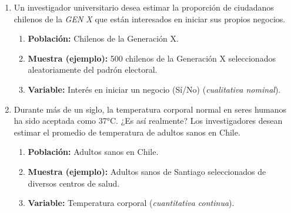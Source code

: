 \documentclass[12pt, letterpaper]{article}
\begin{document}
\begin{enumerate}
    \item Un investigador universitario desea estimar la proporción de ciudadanos chilenos de la \textit{GEN X} que están interesados en iniciar sus propios negocios.
        \begin{enumerate}
            \item \textbf{Población:} Chilenos de la Generación X.
            \item \textbf{Muestra (ejemplo):} 500 chilenos de la Generación X seleccionados aleatoriamente del padrón electoral.
            \item \textbf{Variable:} Interés en iniciar un negocio (Sí/No) (\textit{cualitativa nominal}).
        \end{enumerate}

    \item Durante más de un siglo, la temperatura corporal normal en seres humanos ha sido aceptada como 37°C. ¿Es así realmente? Los investigadores desean estimar el promedio de temperatura de adultos sanos en Chile.
        \begin{enumerate}
            \item \textbf{Población:} Adultos sanos en Chile.
            \item \textbf{Muestra (ejemplo):} Adultos sanos de Santiago seleccionados de diversos centros de salud.
            \item \textbf{Variable:} Temperatura corporal (\textit{cuantitativa continua}).
        \end{enumerate}


\end{enumerate}
\end{document}
